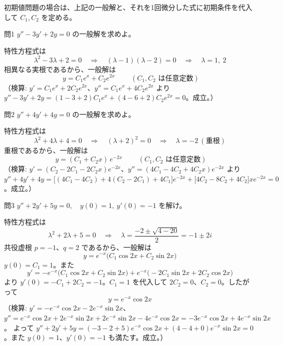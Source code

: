\documentclass[a4paper,11pt]{article}
\begin{document}
\medskip
\noindent
初期値問題の場合は、上記の一般解と、それを1回微分した式に初期条件を代入して $C_{1}, C_{2}$ を定める。

\clearpage
\begin{mondaiboxS}{問1}
$y'' - 3y' + 2y = 0$ の一般解を求めよ。
\end{mondaiboxS}
\kaitou
特性方程式は
\[
\lambda^{2} - 3\lambda + 2 = 0 \quad\Longrightarrow\quad (\lambda-1)(\lambda-2) = 0
\quad\Longrightarrow\quad \lambda = 1,\ 2
\]
相異なる実根であるから、一般解は
\[
\boxed{\; y = C_{1}e^{x} + C_{2}e^{2x} \;}
\qquad (C_{1}, C_{2} \text{ は任意定数})
\]
（検算: $y' = C_{1}e^{x}+2C_{2}e^{2x}$、$y'' = C_{1}e^{x}+4C_{2}e^{2x}$ より
$y''-3y'+2y = (1-3+2)C_{1}e^{x} + (4-6+2)C_{2}e^{2x} = 0$。成立。）

\clearpage
\begin{mondaiboxS}{問2}
$y'' + 4y' + 4y = 0$ の一般解を求めよ。
\end{mondaiboxS}
\kaitou
特性方程式は
\[
\lambda^{2} + 4\lambda + 4 = 0 \quad\Longrightarrow\quad (\lambda+2)^{2} = 0
\quad\Longrightarrow\quad \lambda = -2 \ (\text{重根})
\]
重根であるから、一般解は
\[
\boxed{\; y = (C_{1} + C_{2}x)\,e^{-2x} \;}
\qquad (C_{1}, C_{2} \text{ は任意定数})
\]
（検算: $y' = (C_{2} - 2C_{1} - 2C_{2}x)e^{-2x}$、$y'' = (4C_{1} - 4C_{2} + 4C_{2}x)e^{-2x}$ より
$y''+4y'+4y = \bigl[(4C_{1}-4C_{2}) + 4(C_{2}-2C_{1}) + 4C_{1}\bigr]e^{-2x} + \bigl[4C_{2} - 8C_{2} + 4C_{2}\bigr]xe^{-2x} = 0$。成立。）

\clearpage
\begin{mondaiboxS}{問3}
$y'' + 2y' + 5y = 0, \quad y(0) = 1,\ y'(0) = -1$ を解け。
\end{mondaiboxS}
\kaitou
特性方程式は
\[
\lambda^{2} + 2\lambda + 5 = 0 \quad\Longrightarrow\quad \lambda = \frac{-2 \pm \sqrt{4-20}}{2} = -1 \pm 2i
\]
共役虚根 $p = -1$、$q = 2$ であるから、一般解は
\[
y = e^{-x}\bigl(C_{1}\cos 2x + C_{2}\sin 2x\bigr)
\]
$y(0) = C_{1} = 1$。また
\[
y' = -e^{-x}\bigl(C_{1}\cos 2x + C_{2}\sin 2x\bigr) + e^{-x}\bigl(-2C_{1}\sin 2x + 2C_{2}\cos 2x\bigr)
\]
より $y'(0) = -C_{1} + 2C_{2} = -1$。$C_{1}=1$ を代入して $2C_{2} = 0$、$C_{2} = 0$。したがって
\[
\boxed{\; y = e^{-x}\cos 2x \;}
\]
（検算: $y' = -e^{-x}\cos 2x - 2e^{-x}\sin 2x$、
$y'' = e^{-x}\cos 2x + 2e^{-x}\sin 2x + 2e^{-x}\sin 2x - 4e^{-x}\cos 2x = -3e^{-x}\cos 2x + 4e^{-x}\sin 2x$。
よって $y''+2y'+5y = (-3-2+5)e^{-x}\cos 2x + (4-4+0)e^{-x}\sin 2x = 0$。また $y(0)=1$、$y'(0)=-1$ も満たす。成立。）
\end{document}
